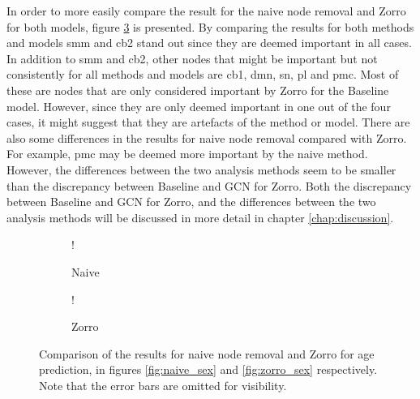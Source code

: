 In order to more easily compare the result for the naive node removal and Zorro for both models, figure \ref{fig:comparison_age} is presented. By comparing the results for both methods and models \acrshort{smm} and \acrshort{cb2} stand out since they are deemed important in all cases. In addition to \acrshort{smm} and \acrshort{cb2}, other nodes that might be important but not consistently for all methods and models are \acrshort{cb1}, \acrshort{dmn}, \acrshort{sn}, \acrshort{pl} and \acrshort{pmc}. Most of these are nodes that are only considered important by Zorro for the Baseline model. However, since they are only deemed important in one out of the four cases, it might suggest that they are artefacts of the method or model.
There are also some differences in the results for naive node removal compared with Zorro. For example, \acrshort{pmc} may be deemed more important by the naive method. However, the differences between the two analysis methods seem to be smaller than the discrepancy between Baseline and GCN for Zorro. Both the discrepancy between Baseline and GCN for Zorro, and the differences between the two analysis methods will be discussed in more detail in chapter \ref{chap:discussion}.

\begin{figure}[!htbp]
    \centering
        \begin{subfigure}{.5\textwidth}
            \centering
            \begin{center}
                \resizebox {1.0\linewidth} {!} {
                    
                }
            \end{center}
            \caption{Naive}
            \label{fig:comparison_age_naive}
        \end{subfigure}%
        \begin{subfigure}{.5\textwidth}
            \centering
            \begin{center}
                \resizebox {1.0\linewidth} {!} {
                    
                }
            \end{center}
            \caption{Zorro}
            \label{fig:comparison_age_zorro}
        \end{subfigure}
    \caption{Comparison of the results for naive node removal and Zorro for age prediction, in figures \ref{fig:naive_sex} and \ref{fig:zorro_sex} respectively. Note that the error bars are omitted for visibility.}
    \label{fig:comparison_age}
\end{figure}